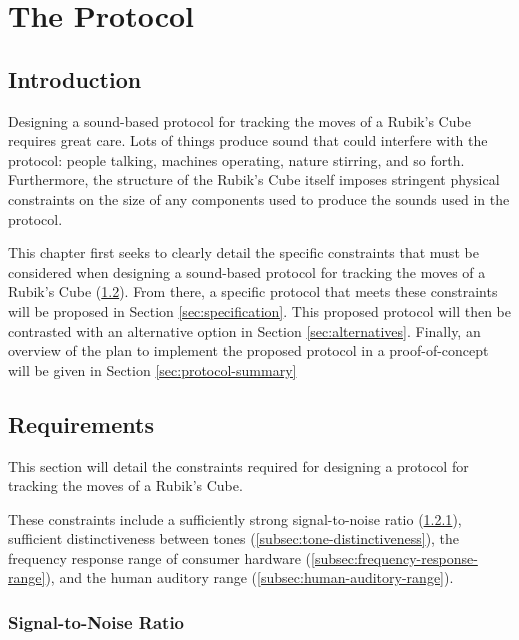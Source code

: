 \chapter{The Protocol} %

\label{Chapter4} %


\section{Introduction}

Designing a sound-based protocol for tracking the moves of a Rubik's
Cube requires great care. Lots of things produce sound that could
interfere with the protocol: people talking, machines operating, nature
stirring, and so forth. Furthermore, the structure of the Rubik's Cube
itself imposes stringent physical constraints on the size of any
components used to produce the sounds used in the protocol.

This chapter first seeks to clearly detail the specific constraints
that must be considered when designing a sound-based protocol for
tracking the moves of a Rubik's Cube (\ref{sec:protocol-requirements}).
From there, a specific protocol that meets these constraints will be
proposed in Section \ref{sec:specification}. This proposed protocol
will then be contrasted with an alternative option in Section
\ref{sec:alternatives}. Finally, an overview of the plan to implement
the proposed protocol in a proof-of-concept will be given in Section
\ref{sec:protocol-summary}


\section{Requirements}
\label{sec:protocol-requirements}

This section will detail the constraints required for designing a
protocol for tracking the moves of a Rubik's Cube.

These constraints include a sufficiently strong signal-to-noise ratio
(\ref{subsec:signal-to-noise-ratio}), sufficient distinctiveness
between tones (\ref{subsec:tone-distinctiveness}), the frequency
response range of consumer hardware
(\ref{subsec:frequency-response-range}), and the human auditory range
(\ref{subsec:human-auditory-range}).

\subsection{Signal-to-Noise Ratio}
\label{subsec:signal-to-noise-ratio}

